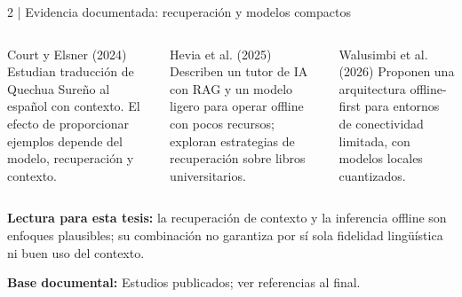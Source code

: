 \documentclass[aspectratio=169,10pt,spanish]{beamer}
\newcommand{\fuente}[1]{\vfill{\tiny\color{bpNavy!75}\textbf{Base documental:} #1}}
\begin{document}
\begin{frame}{2 | Evidencia documentada: recuperación y modelos compactos}
\small
\begin{columns}[T,onlytextwidth]
\begin{block}{Court y Elsner (2024)}
Estudian traducción de Quechua Sureño al español con contexto. El efecto de proporcionar ejemplos depende del modelo, recuperación y contexto.
\end{block}
\begin{block}{Hevia et al. (2025)}
Describen un tutor de IA con RAG y un modelo ligero para operar offline con pocos recursos; exploran estrategias de recuperación sobre libros universitarios.
\end{block}
\begin{block}{Walusimbi et al. (2026)}
Proponen una arquitectura offline-first para entornos de conectividad limitada, con modelos locales cuantizados.
\end{block}
\end{columns}
\vspace{0.2cm}
\begin{tcolorbox}[colback=bpLightGray,colframe=bpNavy]
\centering\small\textbf{Lectura para esta tesis:} la recuperación de contexto y la inferencia offline son enfoques plausibles; su combinación no garantiza por sí sola fidelidad lingüística ni buen uso del contexto.
\end{tcolorbox}
\fuente{Estudios publicados; ver referencias al final.}
\end{frame}
\end{document}
